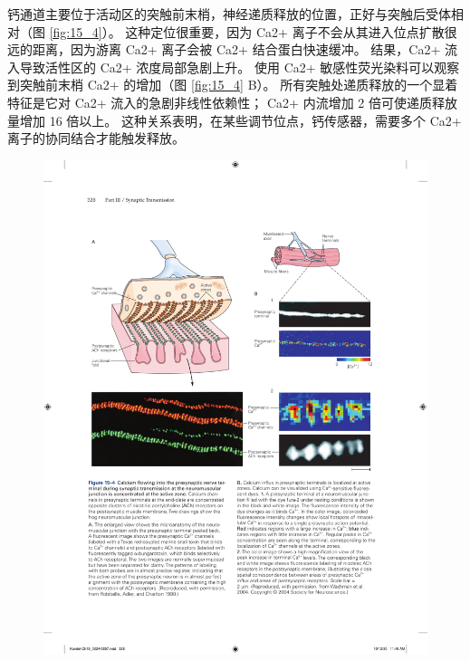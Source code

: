 钙通道主要位于活动区的突触前末梢，神经递质释放的位置，正好与突触后受体相对（图 \ref{fig:15_4}）。 
这种定位很重要，因为 Ca2+ 离子不会从其进入位点扩散很远的距离，因为游离 Ca2+ 离子会被 Ca2+ 结合蛋白快速缓冲。 
结果，Ca2+ 流入导致活性区的 Ca2+ 浓度局部急剧上升。 
使用 Ca2+ 敏感性荧光染料可以观察到突触前末梢 Ca2+ 的增加（图 \ref{fig:15_4} B）。
所有突触处递质释放的一个显着特征是它对 Ca2+ 流入的急剧非线性依赖性； Ca2+ 内流增加 2 倍可使递质释放量增加 16 倍以上。 
这种关系表明，在某些调节位点，钙传感器，需要多个 Ca2+ 离子的协同结合才能触发释放。

\begin{figure}[htbp]
	\centering
	\includegraphics[width=0.9\linewidth]{chap15/fig_15_4}

\end{figure}
